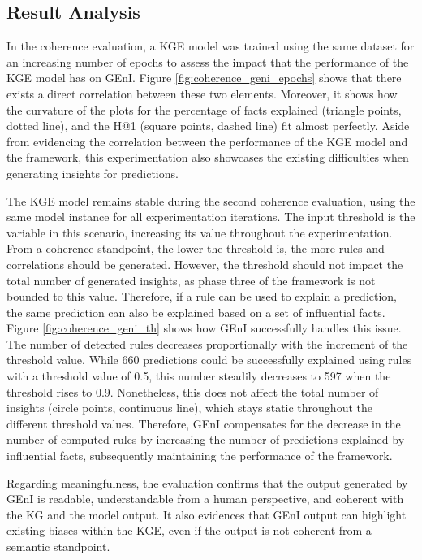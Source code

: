 \subsection{Result Analysis}\label{6_sec:subsec:geni_results}
In the coherence evaluation, a KGE model was trained using the same dataset for an increasing number of epochs to assess the impact that the performance of the KGE model has on GEnI. Figure \ref{fig:coherence_geni_epochs} shows that there exists a direct correlation between these two elements. Moreover, it shows how the curvature of the plots for the percentage of facts explained (triangle points, dotted line), and the H@1 (square points, dashed line) fit almost perfectly. Aside from evidencing the correlation between the performance of the KGE model and the framework, this experimentation also showcases the existing difficulties when generating insights for predictions.

The KGE model remains stable during the second coherence evaluation, using the same model instance for all experimentation iterations. The input threshold is the variable in this scenario, increasing its value throughout the experimentation. From a coherence standpoint, the lower the threshold is, the more rules and correlations should be generated. However, the threshold should not impact the total number of generated insights, as phase three of the framework is not bounded to this value. Therefore, if a rule can be used to explain a prediction, the same prediction can also be explained based on a set of influential facts. Figure \ref{fig:coherence_geni_th} shows how GEnI successfully handles this issue. The number of detected rules decreases proportionally with the increment of the threshold value. While 660 predictions could be successfully explained using rules with a threshold value of 0.5, this number steadily decreases to 597 when the threshold rises to 0.9. Nonetheless, this does not affect the total number of insights (circle points, continuous line), which stays static throughout the different threshold values. Therefore, GEnI compensates for the decrease in the number of computed rules by increasing the number of predictions explained by influential facts, subsequently maintaining the performance of the framework. 

Regarding meaningfulness, the evaluation confirms that the output generated by GEnI is readable, understandable from a human perspective, and coherent with the KG and the model output. It also evidences that GEnI output can highlight existing biases within the KGE, even if the output is not coherent from a semantic standpoint.

